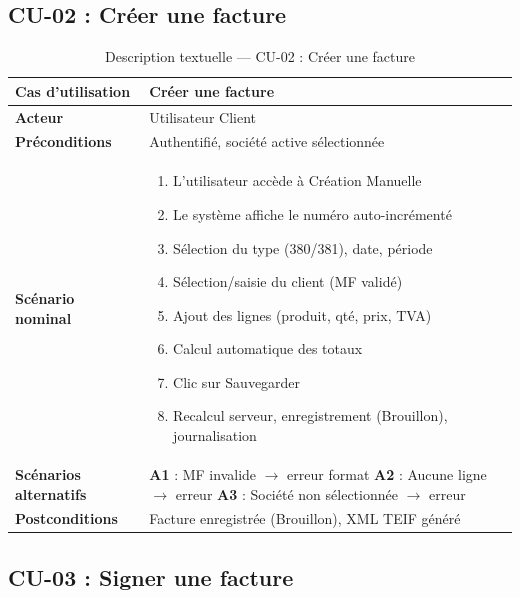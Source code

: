 \documentclass[a4paper,12pt]{report}
\begin{document}
\subsection{CU-02 : Créer une facture}

\begin{table}[htbp]
\centering
\caption{Description textuelle — CU-02 : Créer une facture}
\begin{tabularx}{\textwidth}{|l|X|}
\hline
\textbf{Cas d'utilisation} & Créer une facture \\
\hline
\textbf{Acteur} & Utilisateur Client \\
\hline
\textbf{Préconditions} & Authentifié, société active sélectionnée \\
\hline
\textbf{Scénario nominal} &
\begin{enumerate}[nosep, leftmargin=*]
    \item L'utilisateur accède à Création Manuelle
    \item Le système affiche le numéro auto-incrémenté
    \item Sélection du type (380/381), date, période
    \item Sélection/saisie du client (MF validé)
    \item Ajout des lignes (produit, qté, prix, TVA)
    \item Calcul automatique des totaux
    \item Clic sur Sauvegarder
    \item Recalcul serveur, enregistrement (Brouillon), journalisation
\end{enumerate} \\
\hline
\textbf{Scénarios alternatifs} &
\textbf{A1} : MF invalide $\rightarrow$ erreur format \newline
\textbf{A2} : Aucune ligne $\rightarrow$ erreur \newline
\textbf{A3} : Société non sélectionnée $\rightarrow$ erreur \\
\hline
\textbf{Postconditions} & Facture enregistrée (Brouillon), XML TEIF généré \\
\hline
\end{tabularx}
\end{table}

\subsection{CU-03 : Signer une facture}
\end{document}
